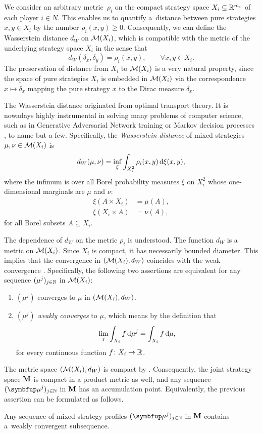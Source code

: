 We consider an arbitrary metric~$\rho_i$ on the compact strategy space $X_i\subseteq \mathbb{R}^{m_i}$ of each player $i\in N$. This enables us to quantify a~distance between pure strategies $x,y \in X_i$ by the number $\rho_i(x,y)\ge 0$. Consequently, we can define the Wasserstein distance $d_W$ on $\mathcal{M}(X_i)$, which is compatible with the metric of the underlying strategy space $X_i$ in the sense that
\[
	d_W(\delta_x,\delta_y)=\rho_i(x,y),\qquad \forall x,y \in X_i.
\]
 The preservation of distance from $X_i$ to $\mathcal{M}(X_i)$ is a very natural property, since the space of pure strategies $X_i$ is embedded in $\mathcal{M}(X_i)$ via the correspondence $x\mapsto \delta_x$ mapping the pure strategy $x$ to the Dirac measure $\delta_x$.

The Wasserstein distance originated from optimal transport theory. It is nowadays highly instrumental in solving many problems of computer science, such as in Generative Adversarial Network training \cite{pmlr-v70-arjovsky17a} or Markov decision processes \cite{NEURIPS2023_61779e9b}, to name but a few. Specifically, the \emph{Wasserstein distance} of mixed strategies $\mu,\nu\in \mathcal{M}(X_i)$ is
\[
	d_W(\mu,\nu) = \inf_{\xi} \int_{X_i^2} \rho_i(x,y) \mathop{}\!\mathrm{d}\xi(x,y),
\]
where the infimum is over all Borel probability measures $\xi$ on $X_i^2$ whose one-dimensional marginals are $\mu$ and $\nu$:
\begin{align*}
  \xi(A\times X_i) & = \mu(A),\\
  \xi(X_i \times A)  & = \nu(A),
\end{align*}
for all Borel subsets $A\subseteq X_i$.

The dependence of $d_W$ on the metric $\rho_i$ is understood. The function $d_W$ is a metric on $\mathcal{M}(X_i)$. Since $X_i$ is compact, it has necessarily bounded diameter. This implies that the convergence in $(\mathcal{M}(X_i),d_W)$ coincides with the weak convergence \cite[Corollary 2.2.2]{Panaretos20}. Specifically, the following two assertions are equivalent for any sequence $(\mu^j)_{j\in\mathbb{N}}$ in $\mathcal{M}(X_i)$:
\begin{enumerate}
  \item $(\mu^j)$ converges to $\mu$ in $(\mathcal{M}(X_i),d_W)$.
  \item $(\mu^j)$ \emph{weakly converges} to $\mu$, which means by the definition that
\[
	\lim_{j} \int\nolimits_{X_i}f \mathop{}\!\mathrm{d} \mu^j =  \int\nolimits_{X_i}f \mathop{}\!\mathrm{d} \mu,
\]
for every continuous function $f\colon X_i\to \mathbb{R}$.
\end{enumerate}

The metric space $(\mathcal{M}(X_i),d_W)$ is compact by \cite[Proposition 2.2.3]{Panaretos20}. Consequently, the joint strategy space $\mathbf{M}$ is compact in a product metric as well, and any sequence $(\bmu^j)_{j\in\N}$ in $\mathbf{M}$ has an accumulation point. Equivalently, the previous assertion can be formulated as follows.
\begin{proposition}\label{prop:convergence}
	Any sequence of mixed strategy profiles $(\bmu^j)_{j\in\N}$ in $\mathbf{M}$ contains a~weakly convergent subsequence.
\end{proposition}

